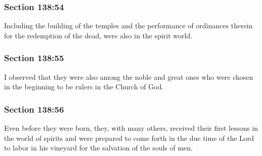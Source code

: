	\subsubsection{Section 138:54} %
		\label{DC138-54}

		Including the building of the temples and the performance of ordinances therein for the redemption of the dead, were also in the spirit world.


	\subsubsection{Section 138:55} %
		\label{DC138-55}

		I observed that they were also among the noble and great ones who were chosen in the beginning to be rulers in the Church of God.


	\subsubsection{Section 138:56} %
		\label{DC138-56}

		Even before they were born, they, with many others, received their first lessons in the world of spirits and were prepared to come forth in the due time of the Lord to labor in his vineyard for the salvation of the souls of men.


